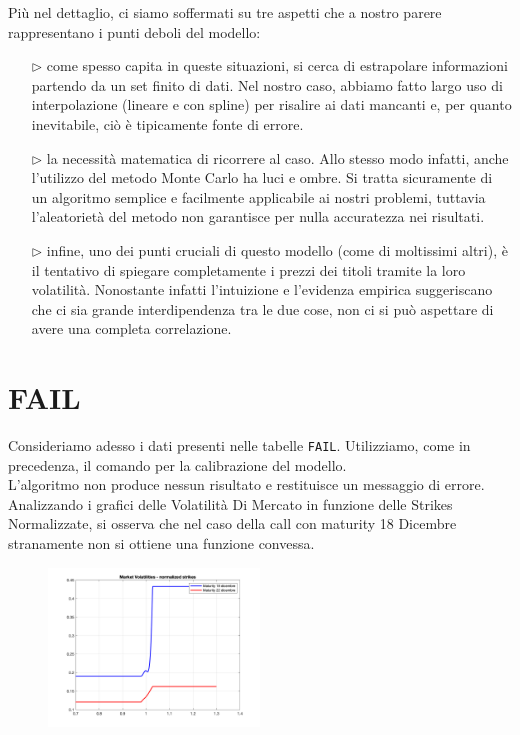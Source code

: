 \documentclass[11pt]{article}
\begin{document}
Più nel dettaglio, ci siamo soffermati su tre aspetti che a nostro parere rappresentano i punti deboli del modello:

\begin{itemize}
	\item[$\rhd$] come spesso capita in queste situazioni, si cerca di estrapolare informazioni partendo da un set finito di dati. Nel nostro caso, abbiamo fatto largo uso di interpolazione (lineare e con spline) per risalire ai dati mancanti e, per quanto inevitabile, ciò è tipicamente fonte di errore.
	\item[$\rhd$] la necessità matematica di ricorrere al caso. Allo stesso modo infatti, anche l'utilizzo del metodo Monte Carlo ha luci e ombre. Si tratta sicuramente di un algoritmo semplice e facilmente applicabile ai nostri problemi, tuttavia l'aleatorietà del metodo non garantisce per nulla accuratezza nei risultati.
	\item[$\rhd$] infine, uno dei punti cruciali di questo modello (come di moltissimi altri), è il tentativo di spiegare completamente i prezzi dei titoli tramite la loro volatilità. Nonostante infatti l'intuizione e l'evidenza empirica suggeriscano che ci sia grande interdipendenza tra le due cose, non ci si può aspettare di avere una completa correlazione.
\end{itemize}

\section{FAIL}
Consideriamo adesso i dati presenti nelle tabelle \texttt{FAIL}. Utilizziamo, come in precedenza, il comando per la calibrazione del modello.\\ L'algoritmo non produce nessun risultato e restituisce un messaggio di errore.
Analizzando i grafici delle Volatilità Di Mercato in funzione delle Strikes Normalizzate, si osserva che nel caso della call con maturity 18 Dicembre stranamente non si ottiene una funzione convessa. 

\begin{figure}[H]
\centering
\includegraphics[width=0.5\textwidth]{MktVol_Knorm}
\end{figure}
\end{document}
